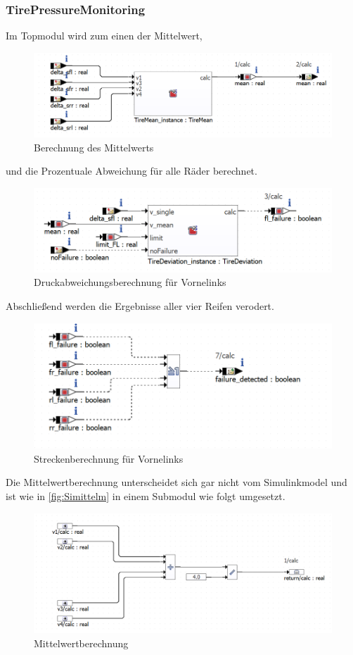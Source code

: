 \subsubsection{TirePressureMonitoring}
Im Topmodul wird zum einen der Mittelwert,
\begin{figure}[H]
	\centering
	\includegraphics[width=0.7\linewidth]{../Graphiken/mean}
	\caption{Berechnung des Mittelwerts}
	\label{fig:Simittelm}
\end{figure}
und die Prozentuale Abweichung für alle Räder berechnet.
\begin{figure}[H]
	\centering
	\includegraphics[width=0.7\linewidth]{../Graphiken/deviation}
	\caption{Druckabweichungsberechnung für Vornelinks}
	\label{fig:abweichung}
\end{figure}
Abschließend werden die Ergebnisse aller vier Reifen verodert.
\begin{figure}[H]
	\centering
	\includegraphics[width=0.7\linewidth]{../Graphiken/or}
	\caption{Streckenberechnung für Vornelinks}
	\label{fig:Sim}
\end{figure}
Die Mittelwertberechnung unterscheidet sich gar nicht vom Simulinkmodel und ist wie in \autoref{fig:Simittelm} in einem Submodul wie folgt umgesetzt.
\begin{figure}[H]
	\centering
	\includegraphics[width=0.8\linewidth]{../Graphiken/meanCalc}
	\caption{Mittelwertberechnung}
	\label{fig:mittel}
\end{figure}

